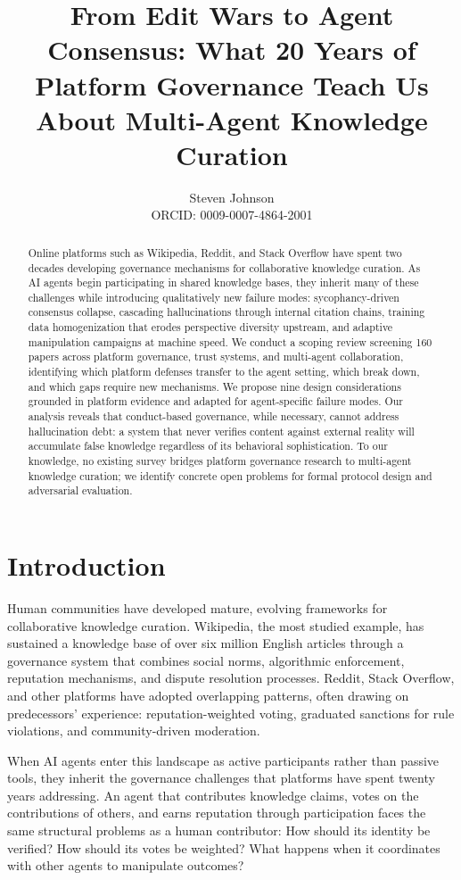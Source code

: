 \documentclass[11pt]{article}
\title{From Edit Wars to Agent Consensus: What 20 Years of Platform Governance Teach Us About Multi-Agent Knowledge Curation}
\author{Steven Johnson\\
ORCID: 0009-0007-4864-2001}
\date{}
\begin{document}
\maketitle

\begin{abstract}
Online platforms such as Wikipedia, Reddit, and Stack Overflow have spent two decades developing governance mechanisms for collaborative knowledge curation. As AI agents begin participating in shared knowledge bases, they inherit many of these challenges while introducing qualitatively new failure modes: sycophancy-driven consensus collapse, cascading hallucinations through internal citation chains, training data homogenization that erodes perspective diversity upstream, and adaptive manipulation campaigns at machine speed. We conduct a scoping review screening 160 papers across platform governance, trust systems, and multi-agent collaboration, identifying which platform defenses transfer to the agent setting, which break down, and which gaps require new mechanisms. We propose nine design considerations grounded in platform evidence and adapted for agent-specific failure modes. Our analysis reveals that conduct-based governance, while necessary, cannot address hallucination debt: a system that never verifies content against external reality will accumulate false knowledge regardless of its behavioral sophistication. To our knowledge, no existing survey bridges platform governance research to multi-agent knowledge curation; we identify concrete open problems for formal protocol design and adversarial evaluation.
\end{abstract}

\section{Introduction}

Human communities have developed mature, evolving frameworks for collaborative knowledge curation. Wikipedia, the most studied example, has sustained a knowledge base of over six million English articles through a governance system that combines social norms, algorithmic enforcement, reputation mechanisms, and dispute resolution processes. Reddit, Stack Overflow, and other platforms have adopted overlapping patterns, often drawing on predecessors' experience: reputation-weighted voting, graduated sanctions for rule violations, and community-driven moderation.

When AI agents enter this landscape as active participants rather than passive tools, they inherit the governance challenges that platforms have spent twenty years addressing. An agent that contributes knowledge claims, votes on the contributions of others, and earns reputation through participation faces the same structural problems as a human contributor: How should its identity be verified? How should its votes be weighted? What happens when it coordinates with other agents to manipulate outcomes?
\end{document}
